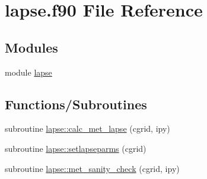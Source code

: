 \hypertarget{lapse_8f90}{}\section{lapse.\+f90 File Reference}
\label{lapse_8f90}
\subsection*{Modules}
\begin{DoxyCompactItemize}
\item 
module \hyperlink{namespacelapse}{lapse}
\end{DoxyCompactItemize}
\subsection*{Functions/\+Subroutines}
\begin{DoxyCompactItemize}
\item 
subroutine \hyperlink{namespacelapse_af49dac7b8f422a32f54148a9cfa0eb99}{lapse\+::calc\+\_\+met\+\_\+lapse} (cgrid, ipy)
\item 
subroutine \hyperlink{namespacelapse_a24cef5bb37190aae0bd256a6f1c927f1}{lapse\+::setlapseparms} (cgrid)
\item 
subroutine \hyperlink{namespacelapse_af5c54ecafe5901655663163b3864accb}{lapse\+::met\+\_\+sanity\+\_\+check} (cgrid, ipy)
\end{DoxyCompactItemize}
